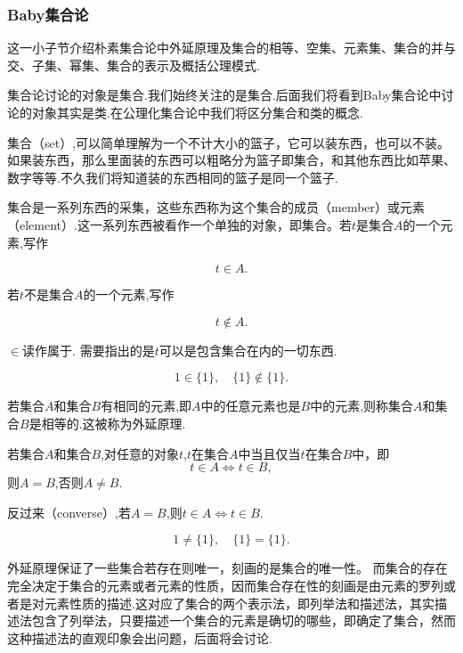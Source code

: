 \subsubsection{Baby集合论}
这一小子节介绍朴素集合论中外延原理及集合的相等、空集、元素集、集合的并与交、子集、幂集、集合的表示及概括公理模式.
\begin{note} 集合论讨论的对象是集合.我们始终关注的是集合.后面我们将看到Baby集合论中讨论的对象其实是类.在公理化集合论中我们将区分集合和类的概念.

    集合（set）,可以简单理解为一个不计大小的篮子，它可以装东西，也可以不装。如果装东西，那么里面装的东西可以粗略分为篮子即集合，和其他东西比如苹果、数字等等.不久我们将知道装的东西相同的篮子是同一个篮子.
\end{note}

集合是一系列东西的采集，这些东西称为这个集合的成员（member）或元素（element）.这一系列东西被看作一个单独的对象，即集合。若$t$是集合$A$的一个元素,写作

\[t\in A.\]

若$t$不是集合$A$的一个元素,写作

\[t\notin A.\]

$\in$读作属于.
需要指出的是$t$可以是包含集合在内的一切东西.
\begin{example}
    \[1\in\{1\},\quad
    \{1\}\notin\{1\}.\]
\end{example}
若集合$A$和集合$B$有相同的元素,即$A$中的任意元素也是$B$中的元素,则称集合$A$和集合$B$是相等的.这被称为外延原理.

\begin{proposition}
    [外延原理]
    若集合$A$和集合$B$,对任意的对象$t$,$t$在集合$A$中当且仅当$t$在集合$B$中，即
    \[t\in A \iff t\in B,\]
    则$A=B$,否则$A\ne B$.
\end{proposition}

反过来（converse）,若$A=B$,则$t\in A\iff t\in B.$

\begin{example}
    \[1\ne\{1\},\quad \{1\}=\{1\}.\]
\end{example}

\begin{note}
    外延原理保证了一些集合若存在则唯一，刻画的是集合的唯一性。
    而集合的存在完全决定于集合的元素或者元素的性质，因而集合存在性的刻画是由元素的罗列或者是对元素性质的描述.这对应了集合的两个表示法，即列举法和描述法，其实描述法包含了列举法，只要描述一个集合的元素是确切的哪些，即确定了集合，然而这种描述法的直观印象会出问题，后面将会讨论.
\end{note}

